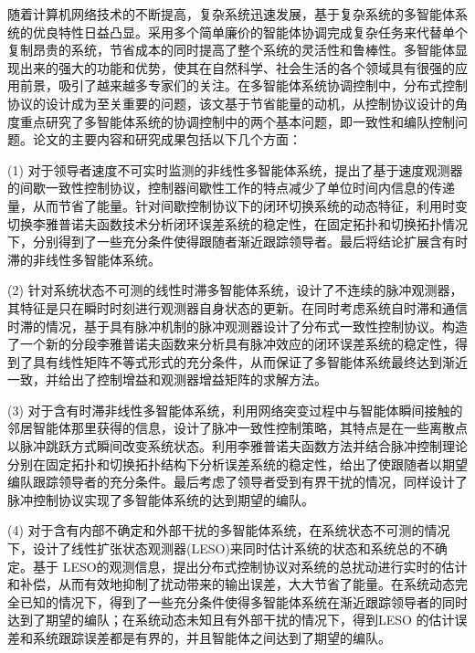

\begin{zhaiyao}

随着计算机网络技术的不断提高，复杂系统迅速发展，基于复杂系统的多智能体系统的优良特性日益凸显。采用多个简单廉价的智能体协调完成复杂任务来代替单个复制昂贵的系统，节省成本的同时提高了整个系统的灵活性和鲁棒性。多智能体显现出来的强大的功能和优势，使其在自然科学、社会生活的各个领域具有很强的应用前景，吸引了越来越多专家们的关注。在多智能体系统协调控制中，分布式控制协议的设计成为至关重要的问题，该文基于节省能量的动机，从控制协议设计的角度重点研究了多智能体系统的协调控制中的两个基本问题，即一致性和编队控制问题。论文的主要内容和研究成果包括以下几个方面：

(1)	对于领导者速度不可实时监测的非线性多智能体系统，提出了基于速度观测器的间歇一致性控制协议，控制器间歇性工作的特点减少了单位时间内信息的传递量，从而节省了能量。针对间歇控制协议下的闭环切换系统的动态特征，利用时变切换李雅普诺夫函数技术分析闭环误差系统的稳定性，在固定拓扑和切换拓扑情况下，分别得到了一些充分条件使得跟随者渐近跟踪领导者。最后将结论扩展含有时滞的非线性多智能体系统。

(2)	针对系统状态不可测的线性时滞多智能体系统，设计了不连续的脉冲观测器，其特征是只在瞬时时刻进行观测器自身状态的更新。在同时考虑系统自时滞和通信时滞的情况，基于具有脉冲机制的脉冲观测器设计了分布式一致性控制协议。构造了一个新的分段李雅普诺夫函数来分析具有脉冲效应的闭环误差系统的稳定性，得到了具有线性矩阵不等式形式的充分条件，从而保证了多智能体系统最终达到渐近一致，并给出了控制增益和观测器增益矩阵的求解方法。

(3)	对于含有时滞非线性多智能体系统，利用网络突变过程中与智能体瞬间接触的邻居智能体那里获得的信息，设计了脉冲一致性控制策略，其特点是在一些离散点以脉冲跳跃方式瞬间改变系统状态。利用李雅普诺夫函数方法并结合脉冲控制理论分别在固定拓扑和切换拓扑结构下分析误差系统的稳定性，给出了使跟随者以期望编队跟踪领导者的充分条件。最后考虑了领导者受到有界干扰的情况，同样设计了脉冲控制协议实现了多智能体系统的达到期望的编队。

(4)	对于含有内部不确定和外部干扰的多智能体系统，在系统状态不可测的情况下，设计了线性扩张状态观测器(LESO)来同时估计系统的状态和系统总的不确定。基于 LESO的观测信息，提出分布式控制协议对系统的总扰动进行实时的估计和补偿，从而有效地抑制了扰动带来的输出误差，大大节省了能量。在系统动态完全已知的情况下，得到了一些充分条件使得多智能体系统在渐近跟踪领导者的同时达到了期望的编队；在系统动态未知且有外部干扰的情况下，得到LESO 的估计误差和系统跟踪误差都是有界的，并且智能体之间达到了期望的编队。

\end{zhaiyao}

